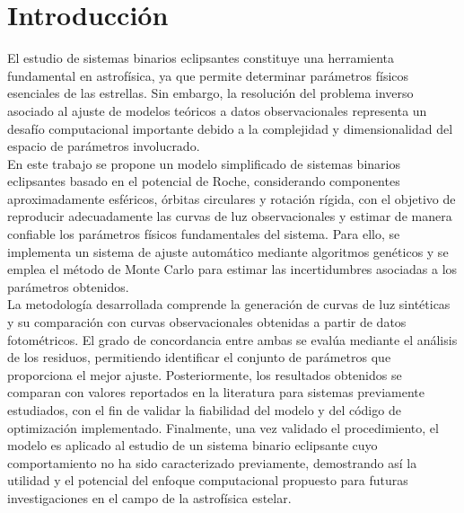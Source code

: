
\chapter*{Introducción}



El estudio de sistemas binarios eclipsantes constituye una herramienta fundamental en astrofísica, ya que permite determinar parámetros físicos esenciales de las estrellas. Sin embargo, la resolución del problema inverso asociado al ajuste de modelos teóricos a datos observacionales representa un desafío computacional importante debido a la complejidad y dimensionalidad del espacio de parámetros involucrado.\\
En este trabajo se propone un modelo simplificado de sistemas binarios eclipsantes basado en el potencial de Roche, considerando componentes aproximadamente esféricos, órbitas circulares y rotación rígida, con el objetivo de reproducir adecuadamente las curvas de luz observacionales y estimar de manera confiable los parámetros físicos fundamentales del sistema. Para ello, se implementa un sistema de ajuste automático mediante algoritmos genéticos y se emplea el método de Monte Carlo para estimar las incertidumbres asociadas a los parámetros obtenidos.\\
La metodología desarrollada comprende la generación de curvas de luz sintéticas y su comparación con curvas observacionales obtenidas a partir de datos fotométricos. El grado de concordancia entre ambas se evalúa mediante el análisis de los residuos, permitiendo identificar el conjunto de parámetros que proporciona el mejor ajuste. Posteriormente, los resultados obtenidos se comparan con valores reportados en la literatura para sistemas previamente estudiados, con el fin de validar la fiabilidad del modelo y del código de optimización implementado. Finalmente, una vez validado el procedimiento, el modelo es aplicado al estudio de un sistema binario eclipsante cuyo comportamiento no ha sido caracterizado previamente, demostrando así la utilidad y el potencial del enfoque computacional propuesto para futuras investigaciones en el campo de la astrofísica estelar.


